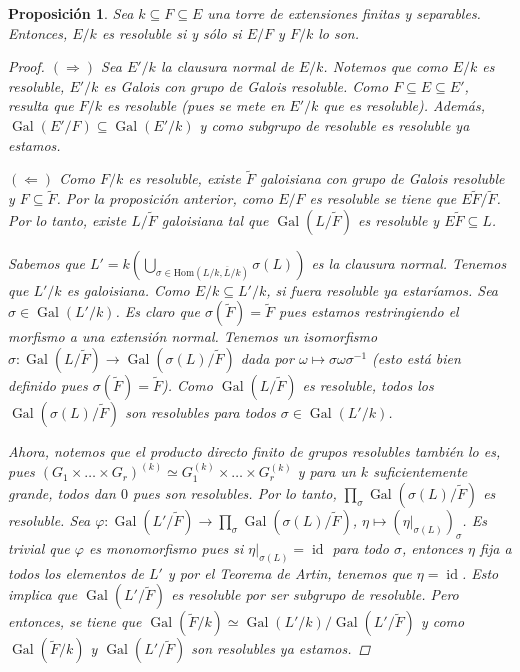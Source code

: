 \documentclass[12pt]{book}
\newtheorem{prop}[teo]{Proposición}
\theoremstyle{definition}
\renewcommand{\hom}{\mathrm{Hom}}
\DeclareMathOperator{\id}{id}
\DeclareMathOperator{\Gal}{Gal}
\begin{document}
\begin{prop}
Sea $k\subseteq F\subseteq E$ una torre de extensiones finitas y separables. Entonces, $E/k$ es resoluble si y sólo si $E/F$ y $F/k$ lo son.
\begin{proof}
$(\Longrightarrow)$ Sea $E'/k$ la clausura normal de $E/k$. Notemos que como $E/k$ es resoluble, $E'/k$ es Galois con grupo de Galois resoluble. Como $F\subseteq E\subseteq E'$, resulta que $F/k$ es resoluble (pues se mete en $E'/k$ que es resoluble). Además, $\Gal(E'/F)\subseteq \Gal(E'/k)$ y como subgrupo de resoluble es resoluble ya estamos.

$(\Longleftarrow)$ Como $F/k$ es resoluble, existe $\widetilde{F}$ galoisiana con grupo de Galois resoluble y $F\subseteq\widetilde{F}$. Por la proposición anterior, como $E/F$ es resoluble se tiene que $E\widetilde{F}/\widetilde{F}$. Por lo tanto, existe $L/\widetilde{F}$ galoisiana tal que $\Gal(L/\widetilde{F})$ es resoluble y $E\widetilde{F}\subseteq L$.

Sabemos que $L' = k\left(\displaystyle\bigcup_{\sigma\in\hom(L/k,\overline{L}/k)}\sigma(L)\right)$ es la clausura normal. Tenemos que $L'/k$ es galoisiana. Como $E/k\subseteq L'/k$, si fuera resoluble ya estaríamos. Sea $\sigma\in\Gal(L'/k)$. Es claro que $\sigma(\widetilde{F})=\widetilde{F}$ pues estamos restringiendo el morfismo a una extensión normal. Tenemos un isomorfismo $\widehat{\sigma}:\Gal(L/\widetilde{F})\to\Gal(\sigma(L)/\widetilde{F})$ dada por $\omega\mapsto \sigma\omega\sigma^{-1}$ (esto está bien definido pues $\sigma(\widetilde{F})=\widetilde{F}$). Como $\Gal(L/\widetilde{F})$ es resoluble, todos los $\Gal(\sigma(L)/\widetilde{F})$ son resolubles para todos $\sigma\in\Gal(L'/k)$.

Ahora, notemos que el producto directo finito de grupos resolubles también lo es, pues $(G_1\times\ldots\times G_r)^{(k)} \simeq G_1^{(k)}\times\ldots\times G_r^{(k)}$ y para un $k$ suficientemente grande, todos dan $0$ pues son resolubles. Por lo tanto, $\displaystyle\prod_{\sigma}\Gal(\sigma(L)/\widetilde{F})$ es resoluble. Sea $\varphi:\Gal(L'/\widetilde{F})\to\displaystyle\prod_{\sigma} \Gal(\sigma(L)/\widetilde{F})$, $\eta\mapsto (\left.\eta\right|_{\sigma(L)})_{\sigma}$. Es trivial que $\varphi$ es monomorfismo pues si $\left.\eta\right|_{\sigma(L)}=\id$ para todo $\sigma$, entonces $\eta$ fija a todos los elementos de $L'$ y por el Teorema de Artin, tenemos que $\eta=\id$. Esto implica que $\Gal(L'/\widetilde{F})$ es resoluble por ser subgrupo de resoluble. Pero entonces, se tiene que $\Gal(\widetilde{F}/k)\simeq \Gal(L'/k)/\Gal(L'/\widetilde{F})$ y como $\Gal(\widetilde{F}/k)$ y $\Gal(L'/\widetilde{F})$ son resolubles ya estamos. 
\end{proof}
\end{prop}
\end{document}
